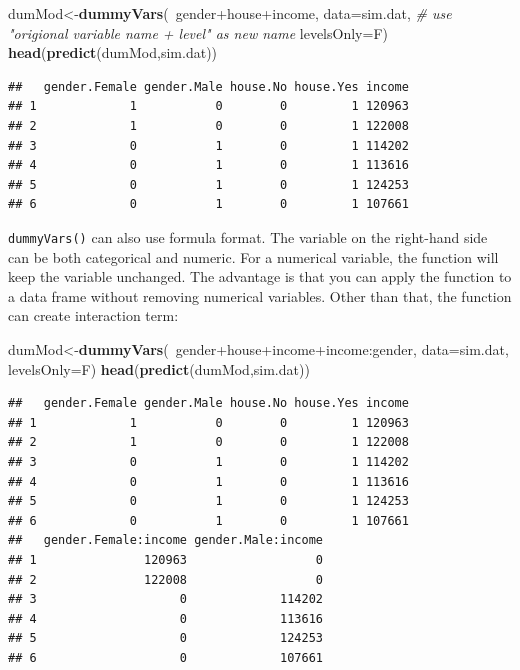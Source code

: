 \documentclass[12pt,]{krantz}
\newenvironment{Shaded}{\begin{snugshade}}{\end{snugshade}}
\newcommand{\KeywordTok}[1]{\textcolor[rgb]{0.13,0.29,0.53}{\textbf{{#1}}}}
\newcommand{\DataTypeTok}[1]{\textcolor[rgb]{0.13,0.29,0.53}{{#1}}}
\newcommand{\CommentTok}[1]{\textcolor[rgb]{0.56,0.35,0.01}{\textit{{#1}}}}
\newcommand{\NormalTok}[1]{{#1}}
\theoremstyle{definition}
\theoremstyle{definition}
\theoremstyle{remark}
\begin{document}
\begin{Shaded}
\begin{Highlighting}[]
\NormalTok{dumMod<-}\KeywordTok{dummyVars}\NormalTok{(~gender+house+income,}
                  \DataTypeTok{data=}\NormalTok{sim.dat,}
                  \CommentTok{# use "origional variable name + level" as new name}
                  \DataTypeTok{levelsOnly=}\NormalTok{F)}
\KeywordTok{head}\NormalTok{(}\KeywordTok{predict}\NormalTok{(dumMod,sim.dat))}
\end{Highlighting}
\end{Shaded}

\begin{verbatim}
##   gender.Female gender.Male house.No house.Yes income
## 1             1           0        0         1 120963
## 2             1           0        0         1 122008
## 3             0           1        0         1 114202
## 4             0           1        0         1 113616
## 5             0           1        0         1 124253
## 6             0           1        0         1 107661
\end{verbatim}

\texttt{dummyVars()} can also use formula format. The variable on the
right-hand side can be both categorical and numeric. For a numerical
variable, the function will keep the variable unchanged. The advantage
is that you can apply the function to a data frame without removing
numerical variables. Other than that, the function can create
interaction term:

\begin{Shaded}
\begin{Highlighting}[]
\NormalTok{dumMod<-}\KeywordTok{dummyVars}\NormalTok{(~gender+house+income+income:gender,}
                  \DataTypeTok{data=}\NormalTok{sim.dat,}
                  \DataTypeTok{levelsOnly=}\NormalTok{F)}
\KeywordTok{head}\NormalTok{(}\KeywordTok{predict}\NormalTok{(dumMod,sim.dat))}
\end{Highlighting}
\end{Shaded}

\begin{verbatim}
##   gender.Female gender.Male house.No house.Yes income
## 1             1           0        0         1 120963
## 2             1           0        0         1 122008
## 3             0           1        0         1 114202
## 4             0           1        0         1 113616
## 5             0           1        0         1 124253
## 6             0           1        0         1 107661
##   gender.Female:income gender.Male:income
## 1               120963                  0
## 2               122008                  0
## 3                    0             114202
## 4                    0             113616
## 5                    0             124253
## 6                    0             107661
\end{verbatim}
\end{document}
